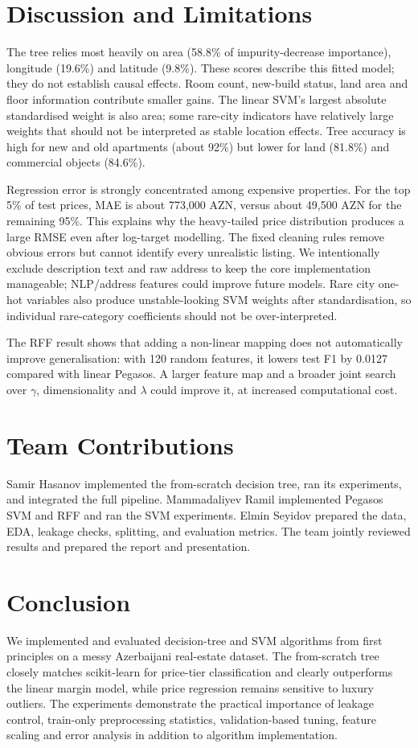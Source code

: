 \documentclass[10pt,twocolumn,a4paper]{article}
\begin{document}
\section{Discussion and Limitations}
The tree relies most heavily on area (58.8\% of impurity-decrease importance), longitude (19.6\%) and latitude (9.8\%). These scores describe this fitted model; they do not establish causal effects. Room count, new-build status, land area and floor information contribute smaller gains. The linear SVM's largest absolute standardised weight is also area; some rare-city indicators have relatively large weights that should not be interpreted as stable location effects. Tree accuracy is high for new and old apartments (about 92\%) but lower for land (81.8\%) and commercial objects (84.6\%).

Regression error is strongly concentrated among expensive properties. For the top 5\% of test prices, MAE is about 773,000 AZN, versus about 49,500 AZN for the remaining 95\%. This explains why the heavy-tailed price distribution produces a large RMSE even after log-target modelling. The fixed cleaning rules remove obvious errors but cannot identify every unrealistic listing. We intentionally exclude description text and raw address to keep the core implementation manageable; NLP/address features could improve future models. Rare city one-hot variables also produce unstable-looking SVM weights after standardisation, so individual rare-category coefficients should not be over-interpreted.

The RFF result shows that adding a non-linear mapping does not automatically improve generalisation: with 120 random features, it lowers test F1 by 0.0127 compared with linear Pegasos. A larger feature map and a broader joint search over $\gamma$, dimensionality and $\lambda$ could improve it, at increased computational cost.

\section{Team Contributions}
Samir Hasanov implemented the from-scratch decision tree, ran its experiments, and integrated the full pipeline. Mammadaliyev Ramil implemented Pegasos SVM and RFF and ran the SVM experiments. Elmin Seyidov prepared the data, EDA, leakage checks, splitting, and evaluation metrics. The team jointly reviewed results and prepared the report and presentation.

\section{Conclusion}
We implemented and evaluated decision-tree and SVM algorithms from first principles on a messy Azerbaijani real-estate dataset. The from-scratch tree closely matches scikit-learn for price-tier classification and clearly outperforms the linear margin model, while price regression remains sensitive to luxury outliers. The experiments demonstrate the practical importance of leakage control, train-only preprocessing statistics, validation-based tuning, feature scaling and error analysis in addition to algorithm implementation.
\end{document}
